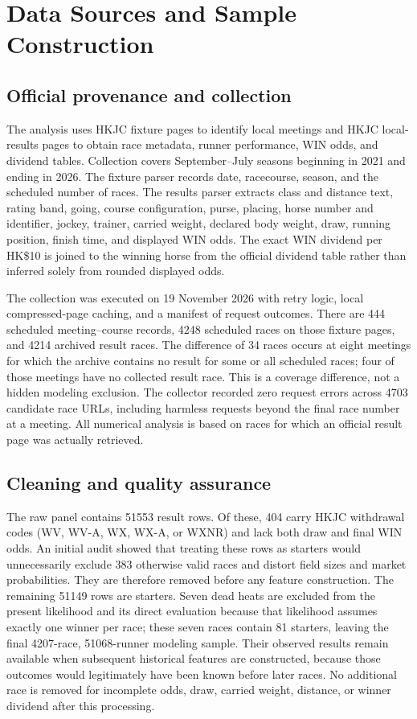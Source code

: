 \section{Data Sources and Sample Construction}\label{sec:data}

\subsection{Official provenance and collection}\label{sec:data-source}
The analysis uses HKJC fixture pages to identify local meetings and HKJC local-results pages to obtain race metadata, runner performance, WIN odds, and dividend tables\cite{hkjcfixtures,hkjcresults}. Collection covers September--July seasons beginning in 2021 and ending in 2026. The fixture parser records date, racecourse, season, and the scheduled number of races. The results parser extracts class and distance text, rating band, going, course configuration, purse, placing, horse number and identifier, jockey, trainer, carried weight, declared body weight, draw, running position, finish time, and displayed WIN odds. The exact WIN dividend per HK\$10 is joined to the winning horse from the official dividend table rather than inferred solely from rounded displayed odds.

The collection was executed on 19 November 2026 with retry logic, local compressed-page caching, and a manifest of request outcomes. There are 444 scheduled meeting--course records, \num{4248} scheduled races on those fixture pages, and \num{4214} archived result races. The difference of 34 races occurs at eight meetings for which the archive contains no result for some or all scheduled races; four of those meetings have no collected result race. This is a coverage difference, not a hidden modeling exclusion. The collector recorded zero request errors across \num{4703} candidate race URLs, including harmless requests beyond the final race number at a meeting. All numerical analysis is based on races for which an official result page was actually retrieved.

\subsection{Cleaning and quality assurance}\label{sec:data-cleaning}
The raw panel contains \num{51553} result rows. Of these, 404 carry HKJC withdrawal codes (WV, WV-A, WX, WX-A, or WXNR) and lack both draw and final WIN odds. An initial audit showed that treating these rows as starters would unnecessarily exclude 383 otherwise valid races and distort field sizes and market probabilities. They are therefore removed before any feature construction. The remaining \num{51149} rows are starters. Seven dead heats are excluded from the present likelihood and its direct evaluation because that likelihood assumes exactly one winner per race; these seven races contain 81 starters, leaving the final \num{4207}-race, \num{51068}-runner modeling sample. Their observed results remain available when subsequent historical features are constructed, because those outcomes would legitimately have been known before later races. No additional race is removed for incomplete odds, draw, carried weight, distance, or winner dividend after this processing.

